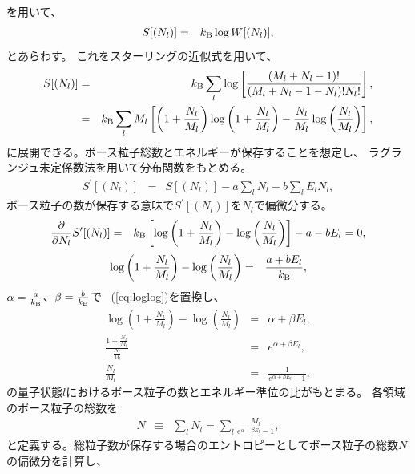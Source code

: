 \documentclass[12pt,a4paper]{jbook}
\newcommand{\kb} {k_{\rm B}}				%
\begin{document}
        を用いて、
		\begin{eqnarray}
			S[(N_l)] & = & \kb \log W[(N_l)],
		\end{eqnarray}
        とあらわす。
        これをスターリングの近似式を用いて、
		\begin{eqnarray}
			S[(N_l)] & = & \kb \sum_l \log
			\left[
				\frac{(M_l+N_l-1)!}{(M_l+N_l-1-N_l)!N_l!}
			\right], \nonumber
			\\
			& = & \kb \sum_l M_l
			\left[
				\left(1 + \frac{N_l}{M_l}\right)
				\log \left(1 + \frac{N_l}{M_l}\right)
				- \frac{N_l}{M_l} \log \left( \frac{N_l}{M_l}\right)
			\right],
		\end{eqnarray}
		に展開できる。ボース粒子総数とエネルギーが保存することを想定し、
        ラグランジュ未定係数法を用いて分布関数をもとめる。
		\begin{eqnarray}
			S^\prime [(N_l )] & = & S[( N_l )] - a \sum_l N_l - b \sum_l E_l N_l,
		\end{eqnarray}
        ボース粒子の数が保存する意味で$S^\prime [(N_l )]$を$N_l$で偏微分する。
		\begin{eqnarray}
			\frac{\partial}{\partial N_l}S^\prime [(N_l )] & = &
			\kb
			\left[
			\log \left(1 + \frac{N_l}{M_l} \right) - \log \left( \frac{N_l}{M_l} \right)
			\right] - a - b E_l = 0,
		\end{eqnarray}
		\begin{eqnarray}
            \label{eq:loglog}
			\log \left(1 + \frac{N_l}{M_l} \right) - \log \left( \frac{N_l}{M_l} \right)
			& = & \frac{a + b E_l}{\kb},
		\end{eqnarray}
		$\alpha = \frac{a}{\kb}$、$\beta = \frac{b}{\kb}$で
		~(\ref{eq:loglog})を置換し、
		\begin{eqnarray}
            \label{eq:logratio}
			\log \left(1 + \frac{N_l}{M_l} \right) - \log \left( \frac{N_l}{M_l} \right)
			& = & \alpha + \beta E_l,
			\\
			\frac{1+\frac{N_l}{M_l}}{\frac{N_l}{M_l}} & = & e^{\alpha + \beta E_l}, \nonumber
			\\
            \label{eq:nlml}
			\frac{N_l}{M_l} & = & \frac{1}{e^{\alpha + \beta E_l} -1},
		\end{eqnarray}
        の量子状態$l$におけるボース粒子の数とエネルギー準位の比がもとまる。
        各領域のボース粒子の総数を
		\begin{eqnarray}
			N & \equiv & \sum_l N_l = \sum_l \frac{M_l}{e^{\alpha + \beta E_l} -1},
		\end{eqnarray}
        と定義する。総粒子数が保存する場合のエントロピーとしてボース粒子の総数$N$の偏微分を計算し、
\end{document}
